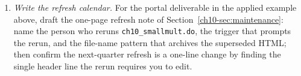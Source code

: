 \begin{enumerate}
\item \emph{Write the refresh calendar.} For the portal deliverable in the applied example above, draft the one-page refresh note of Section~\ref{ch10-sec:maintenance}: name the person who reruns \texttt{ch10\_smallmult.do}, the trigger that prompts the rerun, and the file-name pattern that archives the superseded HTML; then confirm the next-quarter refresh is a one-line change by finding the single header line the rerun requires you to edit.
\end{enumerate}
